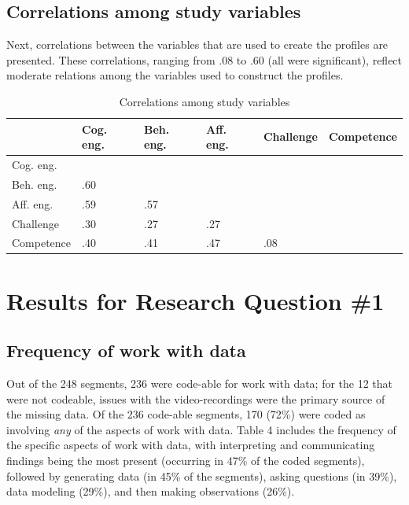 \documentclass[]{book}
\theoremstyle{definition}
\theoremstyle{definition}
\theoremstyle{definition}
\theoremstyle{remark}
\begin{document}
\subsection{Correlations among study
variables}\label{correlations-among-study-variables}

Next, correlations between the variables that are used to create the
profiles are presented. These correlations, ranging from .08 to .60 (all
were significant), reflect moderate relations among the variables used
to construct the profiles.

\begin{landscape}\begin{table}

\caption{\label{tab:unnamed-chunk-8}Correlations among study variables}
\centering
\begin{tabular}[t]{llllll}
\toprule
 & Cog. eng. & Beh. eng. & Aff. eng. & Challenge & Competence\\
\midrule
Cog. eng. &  &  &  &  & \\
Beh. eng. & .60 &  &  &  & \\
Aff. eng. & .59 & .57 &  &  & \\
Challenge & .30 & .27 & .27 &  & \\
Competence & .40 & .41 & .47 & .08 & \\
\bottomrule
\end{tabular}
\end{table}
\end{landscape}

\section{Results for Research Question
\#1}\label{results-for-research-question-1}

\subsection{Frequency of work with
data}\label{frequency-of-work-with-data}

Out of the 248 segments, 236 were code-able for work with data; for the
12 that were not codeable, issues with the video-recordings were the
primary source of the missing data. Of the 236 code-able segments, 170
(72\%) were coded as involving \emph{any} of the aspects of work with
data. Table 4 includes the frequency of the specific aspects of work
with data, with interpreting and communicating findings being the most
present (occurring in 47\% of the coded segments), followed by
generating data (in 45\% of the segments), asking questions (in 39\%),
data modeling (29\%), and then making observations (26\%).
\end{document}
